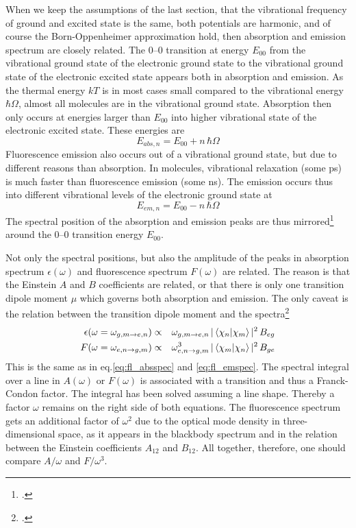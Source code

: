 When we keep the assumptions of the last section, that the vibrational frequency of ground and excited state is the same, both potentials are harmonic, and of course the Born-Oppenheimer approximation hold, then absorption and emission spectrum are closely related. The 0--0 transition at energy $E_{00}$ from the vibrational ground state of the electronic ground state to the vibrational ground state of the electronic excited state appears both in absorption and emission. As the thermal energy $kT$ is in most cases small compared to the vibrational energy $\hbar \Omega$, almost all molecules are in the vibrational ground state. Absorption then only occurs at energies larger than $E_{00}$ into higher vibrational state of the electronic excited state. These energies are
\begin{equation}
  E_{abs, n} = E_{00} + n \, \hbar \Omega
\end{equation}
Fluorescence emission also occurs out of a vibrational ground state, but due to different reasons than absorption. In molecules, vibrational relaxation  (some ps) is much faster than fluorescence emission (some ns). The emission occurs thus into different vibrational levels of the electronic ground state at
\begin{equation}
  E_{em, n} = E_{00} - n \, \hbar \Omega
\end{equation}
The spectral position of the absorption and emission peaks are thus mirrored\footcite[chapter 1.3.2 and 1.3.3]{Lakowicz2010} around the 0--0 transition  energy $E_{00}$.

Not only the spectral positions, but also the amplitude of the peaks in absorption spectrum $\epsilon(\omega)$ and fluorescence spectrum $F(\omega)$ are related. The reason is that the Einstein $A$ and $B$ coefficients are related, or that there is only one transition dipole moment $\mu$ which governs both absorption and emission. The only caveat is the relation between the transition dipole moment and the spectra\footcite[Chapter 5.2]{Parson}
\begin{eqnarray}
   \epsilon(\omega  =  \omega_{g,m \rightarrow e,n} )  & \propto & \omega_{g,m \rightarrow e,n}  \,  | \braket{\chi_n |  \chi_m} |^2 
\, B_{eg} \\
   F(\omega =  \omega_{e,n \rightarrow g,m} ) & \propto & \omega_{e,n \rightarrow g,m}^3 \,  | \braket{\chi_m |  \chi_n} |^2 
\, B_{ge}
\end{eqnarray} 
This is the same as in eq.\ref{eq:fl_absspec} and \ref{eq:fl_emspec}.
The spectral integral over a line in $A(\omega )$ or $F(\omega)$ is associated with a transition and thus a Franck-Condon factor. The integral has been solved assuming a line shape. Thereby a factor $\omega$ remains on the right side of both equations. The fluorescence spectrum gets an additional factor of $\omega^2$ due to the optical mode density in three-dimensional space, as it appears in the blackbody spectrum and in the relation between the Einstein coefficients $A_{12}$ and $B_{12}$.
All together, therefore, one should compare $A / \omega$ and $F / \omega^3$.



